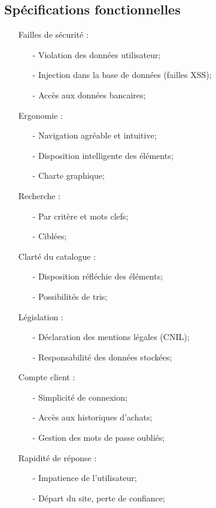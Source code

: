 \documentclass[a4paper]{article}
\begin{document}
	\subsection{Spécifications fonctionnelles}
	\begin{itemize}
		\item[]{Failles de sécurité :}
			\begin{itemize}
				\item[-] Violation des données utilisateur;
				\item[-] Injection dans la base de données (failles XSS);
				\item[-] Accès aux données bancaires;  
			\end{itemize}
		\item[]{Ergonomie :}
			\begin{itemize}
				\item[-] Navigation agréable et intuitive;
				\item[-] Disposition intelligente des éléments;
				\item[-] Charte graphique;
			\end{itemize}
		\item[]{Recherche : }
			\begin{itemize}
				\item[-] Par critère et mots clefs;
				\item[-] Ciblées;
			\end{itemize}
		\item[]{Clarté du catalogue :}
			\begin{itemize}
				\item[-] Disposition réfléchie des éléments;
				\item[-] Possibilités de tris;
			\end{itemize}
		\item[]{Législation :}
			\begin{itemize}
				\item[-] Déclaration des mentions légales (CNIL);
				\item[-] Responsabilité des données stockées;
			\end{itemize}
		\item[]{Compte client :}
			\begin{itemize}
				\item[-] Simplicité de connexion;
				\item[-] Accès aux historiques d'achats;
				\item[-] Gestion des mots de passe oubliés;
			\end{itemize}
		\item[]{Rapidité de réponse :}
			\begin{itemize}
				\item[-] Impatience de l'utilisateur;
				\item[-] Départ du site, perte de confiance; 
			\end{itemize}
	\end{itemize}
\end{document}
